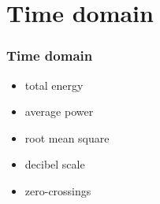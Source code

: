 
\section{Time domain}

\begin{frame}
	\frametitle{Time domain}
	\begin{itemize}
		\item total energy
		\item average power
		\item root mean square
		\item decibel scale
		\item zero-crossings
	\end{itemize}
\end{frame}

